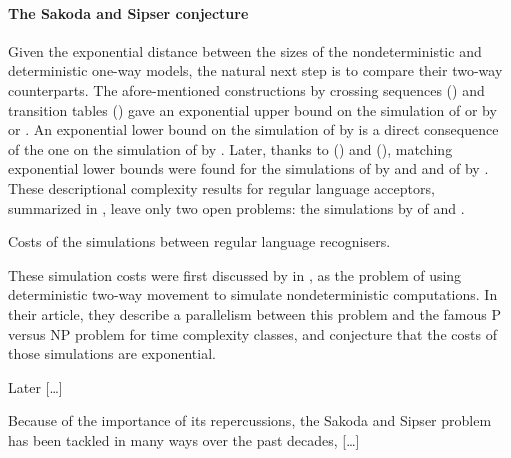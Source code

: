 \paragraph{The Sakoda and Sipser conjecture} Given the exponential distance between the sizes of the nondeterministic and deterministic one-way models, the natural next step is to compare their two-way counterparts.
The afore-mentioned constructions by crossing sequences (\cite{RabSco59}) and transition tables (\cite{She59}) gave an exponential upper bound on the simulation of \TNFA or \TDFA by \ONFA or \ODFA.
An exponential lower bound on the simulation of \TNFA by \ODFA is a direct consequence of the one on the simulation of \ONFA by \ODFA.
Later, thanks to \citeauthor{Bir93} (\citeyear{Bir93}) and \citeauthor{Kap05} (\citeyear{Kap05}), matching exponential lower bounds were found for the simulations of \TDFA by \ONFA and \ODFA and of \TNFA by \ONFA \cite{Bir93,Kap05}.
These descriptional complexity results for regular language acceptors, summarized in , leave only two open problems: the simulations by \TDFA of \TNFA and \ONFA.

\begin{table}
	\centering
	
	\caption{Costs of the simulations between regular language recognisers.}
	\label{tab:sims-core-general-context}
\end{table}

These simulation costs were first discussed by \cite{SakSip78} in \citeyear{SakSip78}, as the problem of using deterministic two-way movement to simulate nondeterministic computations.
In their article, they describe a parallelism between this problem and the famous \textsc{P} versus \textsc{NP} problem for time complexity classes, and conjecture that the costs of those simulations are exponential.

Later [\dots]

Because of the importance of its repercussions, the Sakoda and Sipser problem has been tackled in many ways over the past decades, [\dots]

